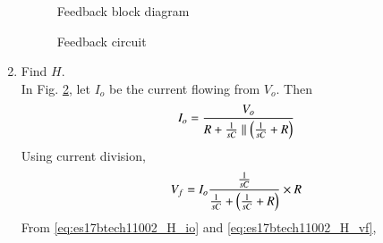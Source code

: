 \begin{enumerate}[label=\arabic*.,ref=\theenumi]
\begin{figure}[!ht]
	\begin{center}
		\resizebox{\columnwidth}{!}{}
	\end{center}
\caption{Feedback block diagram}
\label{fig:es17btech11002_fig4}
\end{figure}
\begin{figure}[!ht]
	\begin{center}
		\resizebox{\columnwidth}{!}{}
	\end{center}
\caption{Feedback circuit}
\label{fig:es17btech11002_fig5}
\end{figure}
\renewcommand{\thefigure}{\theenumi}
\item Find $H$.
\\
\solution In Fig. \ref{fig:es17btech11002_fig5}, let $I_o$ be the current flowing from $V_o$.  Then
\begin{align}
\label{eq:es17btech11002_H_io}
I_o = \frac{V_o}{R + \frac{1}{sC} \parallel \left(\frac{1}{sC}+R\right)}
\end{align}
%
Using current division,
\begin{align}
\label{eq:es17btech11002_H_vf}
V_f = I_o \frac{\frac{1}{sC}}{\frac{1}{sC} +  \left(\frac{1}{sC}+R\right)} \times R
\end{align}
From \eqref{eq:es17btech11002_H_io} and \eqref{eq:es17btech11002_H_vf},


\end{enumerate}
